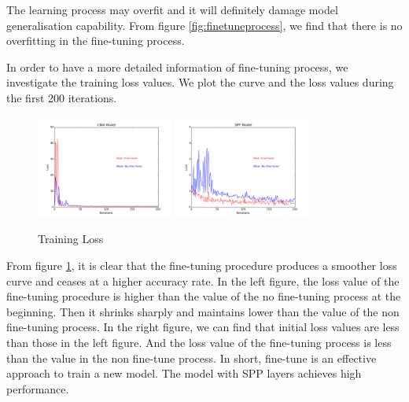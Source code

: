 The learning process may overfit and it will definitely damage model generalisation capability. From figure \ref{fig:finetuneprocess}, we find that there is no overfitting in the fine-tuning process.

In order to have a more detailed information of fine-tuning process, we investigate the training loss values. We plot the curve and the loss values during the first 200 iterations.

\begin{figure}[!htb]
    \centering
	\includegraphics[width=0.4\textwidth]{finetuneCNNProcess.png}
	\includegraphics[width=0.4\textwidth]{finetuneSPPProcess.png}
    \caption{Training Loss}%
    \label{fig:FTvsSC}%
\end{figure}

From figure \ref{fig:FTvsSC}, it is clear that the fine-tuning procedure produces a smoother loss curve and ceases at a higher accuracy rate. In the left figure, the loss value of the fine-tuning procedure is higher than the value of the no fine-tuning process at the beginning. Then it shrinks sharply and maintains lower than the value of the non fine-tuning process. In the right figure, we can find that initial loss values are less than those in the left figure. And the loss value of the fine-tuning process is less than the value in the non fine-tune process. In short, fine-tune is an effective approach to train a new model. The model with SPP layers achieves high performance.

